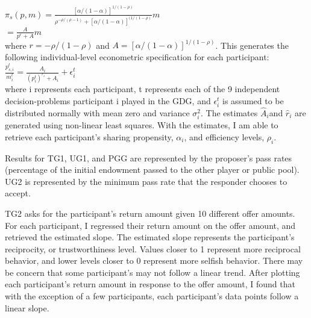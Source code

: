 \documentclass[12pt]{article}
\begin{document}
\(\pi_{s}(p,m)=\frac{[\alpha/(1-\alpha)]^{1/(1-\rho)}}{\rho^{-\rho/(\rho-1)}+[\alpha/(1-\alpha)]^{(1/(1-\rho)}}m\) \\

\hspace{13mm} \(= \frac{A}{p^{r}+A}m \) \\
 
 \noindent
where \(r=-\rho / (1-\rho) \) and \(A=[\alpha / (1-\alpha)]^{1/(1-\rho)} \). This generates the following individual-level econometric specification for each participant: \\
 
\( \frac{p^{t}_{s,i}}{m^{t}_{i}} = \frac{A_{i}}{(p^{t}_{i})^{r_{i}} + A_{i}} + \epsilon^{t}_{i}\) \\
 
\noindent
where i represents each participant, t represents each of the 9 independent decision-problems participant i played in the GDG, and \( \epsilon^{t}_{i} \) is assumed to be distributed normally with mean zero and variance \(\sigma^{2}_{i}\). The estimates \( \hat{A}_{i} \)and \( \hat{r}_{i} \) are generated using non-linear least squares. With the estimates, I am able to retrieve each participant's sharing propensity, \( \alpha_{i} \), and efficiency levels, \( \rho_{i}\).

Results for TG1, UG1, and PGG are represented by the proposer\rq s pass rates (percentage of the initial endowment passed to the other player or public pool). UG2 is represented by the minimum pass rate that the responder chooses to accept. 

TG2 asks for the participant\rq s return amount given 10 different offer amounts. For each participant, I regressed their return amount on the offer amount, and retrieved the estimated slope. The estimated slope represents the participant\rq s reciprocity, or trustworthiness level. Values closer to 1 represent more reciprocal behavior, and lower levels closer to 0 represent more selfish behavior. There may be concern that some participant\rq s may not follow a linear trend. After plotting each participant\rq s return amount in response to the offer amount, I found that with the exception of a few participants, each participant\rq s data points follow a linear slope.
\end{document}
